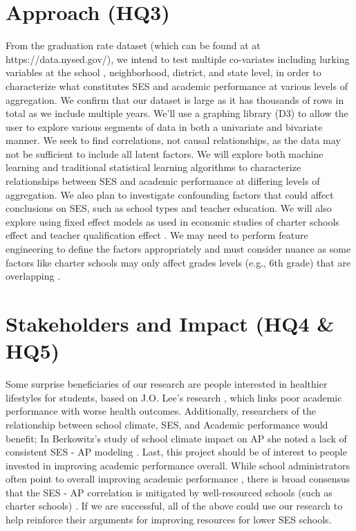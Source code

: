 \documentclass[sigconf,nonacm,11pt]{acmart}
\begin{document}
\section{Approach (HQ3)}
From the graduation rate dataset (which can be found at at https://data.nysed.gov/), we intend to test multiple co-variates including lurking variables at the school \cite{parentalinvolvement}, neighborhood, district, and state level, in order to characterize what constitutes SES and academic performance at various levels of aggregation. We confirm that our dataset is large as it has thousands of rows in total as we include multiple years. We'll use a graphing library (D3) to allow the user to explore various segments of data in both a univariate and bivariate manner. We seek to find correlations, not causal relationships, as the data may not be sufficient to include all latent factors. We will explore both machine learning and traditional statistical learning algorithms to characterize relationships between SES and academic performance at differing levels of aggregation. We also plan to investigate confounding factors that could affect conclusions on SES, such as school types and teacher education. We will also explore using fixed effect models as used in economic studies of charter schools effect \cite{winters, jinnai} and teacher qualification effect \cite{harris}. We may need to perform feature engineering to define the factors appropriately and must consider nuance as some factors like charter schools may only affect grades levels (e.g., 6th grade) that are overlapping \cite{jinnai}.

\section{Stakeholders and Impact (HQ4 \& HQ5)}
Some surprise beneficiaries of our research are people interested in healthier lifestyles for students, based on J.O. Lee's research \cite{lee}, which links poor academic performance with worse health outcomes. Additionally, researchers of the relationship between school climate, SES, and Academic performance would benefit; In Berkowitz's study of school climate impact on AP she noted a lack of consistent SES - AP modeling \cite{berkowitz}. Last, this project should be of interest to people invested in improving academic performance overall. While school administrators often point to overall improving academic performance \cite{domanico}, there is broad consensus that the SES - AP correlation is mitigated by well-resourced schools (such as charter schools) \cite{domanico, jinnai}. If we are successful, all of the above could use our research to help reinforce their arguments for improving resources for lower SES schools.
\end{document}
